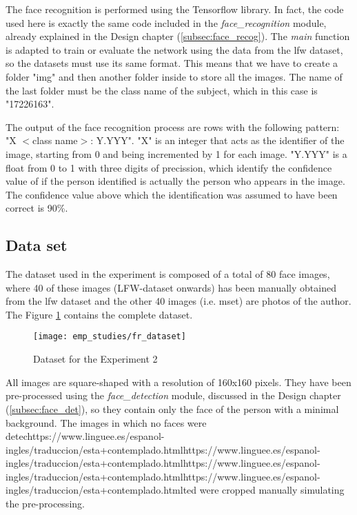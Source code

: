 	The face recognition is performed using the Tensorflow library. In fact, the code used here is exactly the same code included in the \textit{face{\_}recognition} module, already explained in the Design chapter (\ref{subsec:face_recog}). The \textit{main} function is adapted to train or evaluate the network using the data from the \gls{lfw} dataset, so the datasets must use its same format. This means that we have to create a folder "img" and then another folder inside to store all the images. The name of the last folder must be the class name of the subject, which in this case is "17226163". 

	The output of the face recognition process are rows with the following pattern: "X $<$class name$>$: Y.YYY". "X" is an integer that acts as the identifier of the image, starting from 0 and being incremented by 1 for each image. "Y.YYY" is a float from 0 to 1 with three digits of precission, which identify the confidence value of if the person identified is actually the person who appears in the image. The confidence value above which the identification was assumed to have been correct is 90\%.

	\subsection{Data set}
	The dataset used in the experiment is composed of a total of 80 face images, where 40 of these images (LFW-dataset onwards) has been manually obtained from the \gls{lfw} dataset and the other 40 images (i.e. \gls{mset}) are photos of the author. The Figure \ref{fig:fr_dataset} contains the complete dataset. 

	\begin{figure}[!ht]
		\centering
		\texttt{[image: emp\_studies/fr\_dataset]}
		\caption{Dataset for the Experiment 2}
		\label{fig:fr_dataset}
	\end{figure}

	All images are square-shaped with a resolution of 160x160 pixels. They have been pre-processed using the \textit{face{\_}detection} module, discussed in the Design chapter (\ref{subsec:face_det}), so they contain only the face of the person with a minimal background. The images in which no faces were detechttps://www.linguee.es/espanol-ingles/traduccion/esta+contemplado.htmlhttps://www.linguee.es/espanol-ingles/traduccion/esta+contemplado.htmlhttps://www.linguee.es/espanol-ingles/traduccion/esta+contemplado.htmlhttps://www.linguee.es/espanol-ingles/traduccion/esta+contemplado.htmlted were cropped manually simulating the pre-processing.

